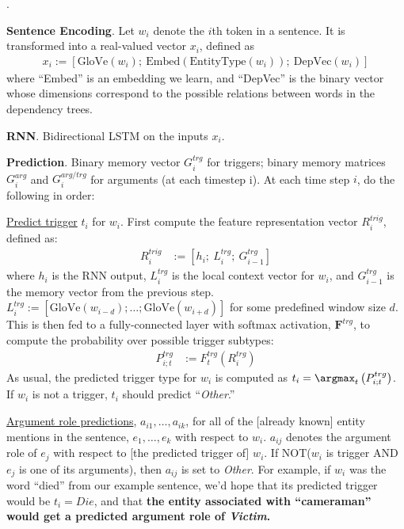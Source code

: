 \documentclass[11pt]{article}
\renewcommand\vec[2][]{\bm{#2}_{#1}}
\newcommand\myspace[1][]{\vspace{#1\bigskipamount}}
\newcommand\p{\Needspace{10\baselineskip} \noindent}
\begin{document}
\myspace
\p {}. 
\begin{compactitem}[-]
	\item \textbf{Sentence Encoding}. Let $w_i$ denote the $i$th token in a sentence. It is transformed into a real-valued vector $x_i$, defined as
	\begin{align}
		x_i := \left[ \text{GloVe}(w_i);~ \text{Embed}(\text{EntityType}(w_i));~ \text{DepVec}(w_i)    \right]
	\end{align}
	where ``Embed'' is an embedding we learn, and ``DepVec'' is the binary vector whose dimensions correspond to the possible relations between words in the dependency trees. 
	
	\item \textbf{RNN}. Bidirectional LSTM on the inputs $x_i$. 
	
	\item \textbf{Prediction}. Binary memory vector $G_i^{trg}$ for triggers; binary memory matrices $G_i^{arg}$ and $G_i^{arg/trg}$ for arguments (at each timestep i). At each time step $i$, do the following in order:
	\begin{compactenum}
		\item \underline{Predict trigger} $t_i$ for $w_i$. First compute the feature representation vector $R_i^{trig}$, defined as:
		\begin{align}
			R_i^{trig} &:= \left[ h_i;~ L_i^{trg};~ G_{i-1}^{trg} \right]
		\end{align}
		where $h_i$ is the RNN output, $L_i^{trg}$ is the local context vector for $w_i$, and $G_{i-1}^{trg}$ is the memory vector from the previous step. $L_i^{trg} := [\text{GloVe}(w_{i-d}); \ldots; \text{GloVe}(w_{i + d})]$ for some predefined window size $d$. This is then fed to a fully-connected layer with softmax activation, $\vec{F}^{trg}$, to compute the probability over possible trigger subtypes:
		\begin{align}
			P_{i;t}^{trg} &:= F_t^{trg}(R_i^{trg})
		\end{align}
		As usual, the predicted trigger type for $w_i$ is computed as $t_i = \argmax_t \left( P_{i;t}^{trg} \right)$. If $w_i$ is not a trigger, $t_i$ should predict ``\textit{Other}.''
		
		\item \underline{Argument role predictions}, $a_{i1}, \ldots, a_{ik}$, for all of the [already known] entity mentions in the sentence, $e_1, \ldots, e_k$ with respect to $w_i$. $a_{ij}$ denotes the argument role of $e_j$ with respect to [the predicted trigger of] $w_i$. If NOT($w_i$ is trigger AND $e_j$ is one of its arguments), then $a_{ij}$ is set to \textit{Other}. For example, if $w_i$ was the word ``died'' from our example sentence, we'd hope that its predicted trigger would be $t_i = Die$, and that \textbf{the entity associated with ``cameraman'' would get a predicted argument role of \textit{Victim}.}
		

\end{compactenum}
\end{compactitem}
\end{document}
